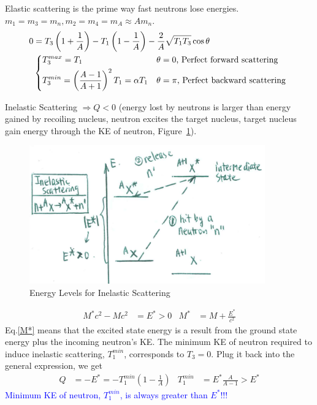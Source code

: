 \documentclass{school-22.101-notes}
\begin{document}
Elastic scattering is the prime way fast neutrons lose energies. $m_1 = m_3 = m_n, m_2 = m_4 = m_A \approx A m_n$. 
\begin{align}
0 &= T_3 \left( 1 + \frac{1}{A} \right)  - T_1 \left( 1 - \frac{1}{A} \right) - \frac{2}{A} \sqrt{ T_1 T_3} \cos \theta \\
&\begin{dcases*}
T_3^{max} = T_1 &  $\theta = 0$,  Perfect forward scattering \\
T_3^{min} = \left( \frac{A-1}{A+1} \right)^2 T_1 = \alpha T_1 & $\theta = \pi$, Perfect backward scattering 
\end{dcases*}
\end{align}

Inelastic Scattering $\Rightarrow Q < 0$ (energy lost by neutrons is larger than energy gained by recoiling nucleus, neutron excites the target nucleus, target nucleus gain energy through the KE of neutron, Figure~\ref{inelastic-energy}). 
\begin{figure}
    \centering
    \includegraphics[width=4in]{images/ni/inelastic-energy.png}
    \caption{Energy Levels for Inelastic Scattering\label{inelastic-energy}}
\end{figure}
\begin{align}
M^* c^2 - M c^2 &= E^* > 0  & M^* &= M + \frac{E^*}{c^2} \label{M*}
\end{align}
Eq.\ref{M*} means that the excited state energy is a result from the ground state energy plus the incoming neutron's KE. The minimum KE of neutron required to induce inelastic scattering, $T_1^{min}$, corresponds to $T_3 = 0$. Plug it back into the general expression, we get 
\begin{align}
Q &= - E^* = -T_1^{min} \left( 1 - \frac{1}{A} \right) & T_1^{min} &= E^* \frac{A}{A-1} > E^* 
\end{align}
\textcolor{blue}{Minimum KE of neutron, $T_1^{min}$, is always greater than $E^*$!!!}
\end{document}
